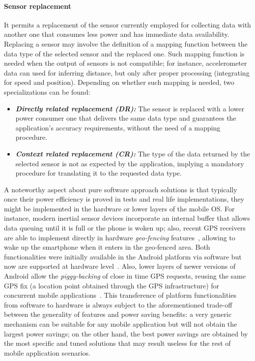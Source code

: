 \documentclass[ENG,PhD]{cinvestav}
\begin{document}
\paragraph{Sensor replacement}
It permits a replacement of the sensor currently employed for collecting data with another one that consumes less power and has immediate data availability.
Replacing a sensor may involve the definition of a mapping function between the data type of the selected sensor and the replaced one.
Such mapping function is needed when the output of sensors is not compatible; for instance, accelerometer data can used for inferring distance, but only after proper processing (integrating for speed and position).
Depending on whether such mapping is needed, two specializations can be found:
\begin{itemize}
  \item \emph{\textbf{Directly related replacement (DR):}} The sensor is replaced with a lower power consumer one that delivers the same data type and guarantees the application's accuracy requirements, without the need of a mapping procedure.
  \item \emph{\textbf{Context related replacement (CR):}} The type of the data returned by the selected sensor is not as expected by the application, implying a mandatory procedure for translating it to the requested data type.
\end{itemize}

A noteworthy aspect about pure software approach solutions is that typically once their power efficiency is proved in tests and real life implementations, they might be implemented in the hardware or lower layers of the mobile OS.
For instance, modern inertial sensor devices incorporate an internal buffer that allows data queuing until it is full or the phone is woken up; also, recent GPS receivers are able to implement directly in hardware \emph{geo-fencing} features~\cite{Torroja2013}, allowing to wake up the smartphone when it enters in the geo-fenced area.
Both functionalities were initially available in the Android platform via software but now are supported at hardware level~\cite{Android2013,Developers2014}.
Also, lower layers of newer versions of Android allow the \emph{piggy-backing} of close in time GPS requests, reusing the same GPS fix (a location point obtained through the GPS infrastructure) for concurrent mobile applications~\cite{Zhuang2010}. 
This transference of platform functionalities from software to hardware is always subject to the aforementioned trade-off between the generality of features and power saving benefits: a very generic mechanism can be suitable for any mobile application but will not obtain the largest power savings; on the other hand, the best power savings are obtained by the most specific and tuned solutions that may result useless for the rest of mobile application scenarios.
\end{document}

